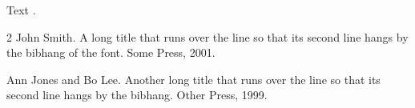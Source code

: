 \documentclass[11pt]{article}
\begin{document}
Text \citep{a}.

\begin{thebibliography}{2}
John Smith.
\newblock A long title that runs over the line so that its second line hangs by the bibhang of the font.
\newblock Some Press, 2001.

Ann Jones and Bo Lee.
\newblock Another long title that runs over the line so that its second line hangs by the bibhang.
\newblock Other Press, 1999.
\end{thebibliography}
\end{document}
